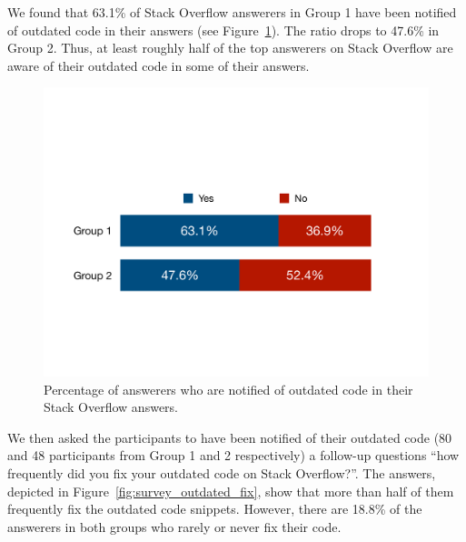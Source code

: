 \documentclass{svjour3}                     %
\begin{document}
We found that 63.1\% of Stack Overflow answerers in Group 1 have been notified of
outdated code in their answers (see Figure~\ref{fig:survey_outdated}). The ratio drops to 47.6\% in
Group 2. Thus, at least roughly half of the top answerers on Stack Overflow
are aware of their outdated code in some of their answers.

\begin{figure}
	\centering
	\includegraphics[width=.5\linewidth]{survey_outdated}
	\caption{Percentage of answerers who are notified of outdated code in their Stack Overflow answers.}
	\label{fig:survey_outdated}
\end{figure}%

\vspace{0.5cm}
\noindent{}
\vspace{0.5cm}

\vspace{0.5cm}
\noindent{}
\vspace{0.5cm}

We then asked the participants to have been notified of their outdated code
(80 and 48 participants from Group 1 and 2 respectively) a
follow-up questions ``how frequently did you fix your outdated code on Stack
Overflow?''. The answers, depicted in Figure~\ref{fig:survey_outdated_fix}, show that
more than half of them frequently fix the outdated code snippets. However, there
are 18.8\% of the answerers in both groups who rarely or never fix their code.
\end{document}

